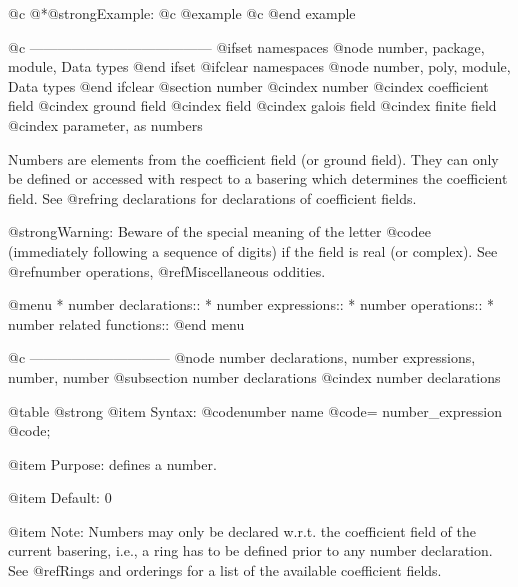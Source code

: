 {{{{{{@c @*@strong{Example:}
@c @example
@c @end example

@c ---------------------------------------
@ifset namespaces
@node number, package, module, Data types
@end ifset
@ifclear namespaces
@node number, poly, module, Data types
@end ifclear
@section number
@cindex number
@cindex coefficient field
@cindex ground field
@cindex field
@cindex galois field
@cindex finite field
@cindex parameter, as numbers

Numbers are elements from the coefficient field (or ground field).
They can only be defined or accessed with respect to a basering
which determines the coefficient field. See @ref{ring declarations} for
declarations of coefficient fields.

@strong{Warning:} Beware of the special meaning of the letter @code{e}
(immediately following a sequence of digits) if the field is real (or complex).
See @ref{number operations}, @ref{Miscellaneous oddities}.

@menu
* number declarations::
* number expressions::
* number operations::
* number related functions::
@end menu

@c ------------------------------
@node number declarations, number expressions, number, number
@subsection number declarations
@cindex number declarations

@table @strong
@item Syntax:
@code{number} name @code{=} number_expression @code{;}

@item Purpose:
defines a number.

@item Default:
0

@item Note:
Numbers may only be declared w.r.t. the coefficient field of the current
basering, i.e., a ring
has to be defined prior to any number declaration. See @ref{Rings and
orderings} for a list of the available coefficient fields.

}}}}}}
